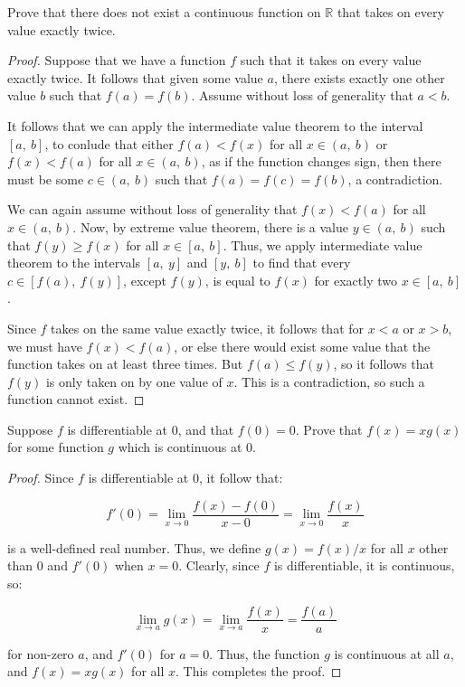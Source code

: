 \documentclass[10pt, oneside]{article}
\newenvironment{problem}[2][Problem]{\begin{trivlist}
\item[\hskip \labelsep {\bfseries #1}\hskip \labelsep {\bfseries #2.}]}{\end{trivlist}}
\begin{document}
    \begin{problem}{10.20a}
      Prove that there does not exist a continuous function on $\mathbb{R}$ that takes on every value exactly twice.
    \end{problem}

    \begin{proof}
      Suppose that we have a function $f$ such that it takes on every value exactly twice. It follows that given some value $a$, there
      exists exactly one other value $b$ such that $f(a) = f(b)$. Assume without loss of generality that $a < b$.
      \newline

      It follows that we
      can apply the intermediate value theorem to the interval $[a, \ b]$, to conlude that either $f(a) < f(x)$ for all $x \in (a, \ b)$ or $f(x) < f(a)$
      for all $x \in (a, \ b)$, as if the function changes sign, then there must be some $c \in (a, \ b)$ such that $f(a) = f(c) = f(b)$, a contradiction.
      \newline

      We can again assume without loss of generality that $f(x) < f(a)$ for all $x \in (a, \ b)$. Now, by extreme value theorem, there is a value $y \in (a, \ b)$ such that
      $f(y) \geq f(x)$ for all $x \in [a, \ b]$. Thus, we apply intermediate value theorem to the intervals $[a, \ y]$ and $[y, \ b]$ to find that every $c \in [f(a), \ f(y)]$, except $f(y)$,
      is equal to $f(x)$ for exactly two $x \in [a, \ b]$.
      \newline

      Since $f$ takes on the same value exactly twice, it follows that for $x < a$ or $x > b$, we must have $f(x) < f(a)$, or else there would exist some value that the function takes on at least
      three times. But $f(a) \leq f(y)$, so it follows that $f(y)$ is only taken on by one value of $x$. This is a contradiction, so such a function cannot exist.
    \end{proof}

    \begin{problem}{10.27}
      Suppose $f$ is differentiable at $0$, and that $f(0) = 0$. Prove that $f(x) = x g(x)$ for some function $g$ which is continuous at $0$.
    \end{problem}

    \begin{proof}
      Since $f$ is differentiable at $0$, it follow that:

      $$f'(0) = \lim_{x \to 0} \frac{f(x) - f(0)}{x - 0} = \lim_{x \to 0} \frac{f(x)}{x}$$

      is a well-defined real number. Thus, we define $g(x) = f(x)/x$ for all $x$ other than $0$ and $f'(0)$ when $x = 0$. Clearly, since
      $f$ is differentiable, it is continuous, so:

      $$\lim_{x \to a} g(x) = \lim_{x \to a} \frac{f(x)}{x} = \frac{f(a)}{a}$$

      for non-zero $a$, and $f'(0)$ for $a = 0$. Thus, the function $g$ is continuous at all $a$, and $f(x) = x g(x)$ for all $x$. This completes the proof.
    \end{proof}
\end{document}
